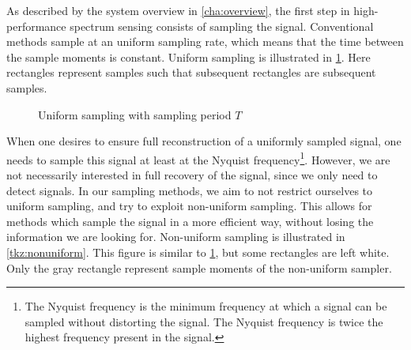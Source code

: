 \documentclass[a4paper, openany, oneside]{memoir}
\begin{document}
As described by the system overview in \cref{cha:overview}, the first step in high-performance spectrum sensing consists of sampling the signal. Conventional methods sample at an uniform sampling rate, which means that the time between the sample moments is constant. Uniform sampling is illustrated in \cref{tkz:uniform}. Here rectangles represent samples such that subsequent rectangles are subsequent samples.

\begin{figure}[H]
\centering
{}
\caption{Uniform sampling with sampling period $T$}\label{tkz:uniform}
\end{figure}

When one desires to ensure full reconstruction of a uniformly sampled signal, one needs to sample this signal at least at the Nyquist frequency\footnote{The Nyquist frequency is the minimum frequency at which a signal can be sampled without distorting the signal. The Nyquist frequency is twice the highest frequency present in the signal.}. However, we are not necessarily interested in full recovery of the signal, since we only need to detect signals. In our sampling methods, we aim to not restrict ourselves to uniform sampling, and try to exploit non-uniform sampling. This allows for methods which sample the signal in a more efficient way, without losing the information we are looking for. Non-uniform sampling is illustrated in \cref{tkz:nonuniform}. This figure is similar to \cref{tkz:uniform}, but some rectangles are left white. Only the gray rectangle represent sample moments of the non-uniform sampler.
\end{document}
